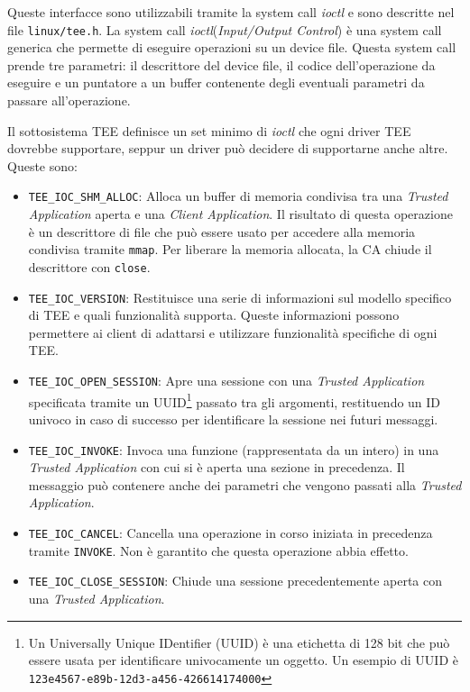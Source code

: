 \documentclass[12pt,italian]{report}
\begin{document}
Queste interfacce sono utilizzabili tramite la system call \textit{ioctl}
e sono descritte nel file \texttt{linux/tee.h}.
La system call \textit{ioctl}(\textit{Input/Output Control})
è una system call generica che permette di
eseguire operazioni su un device file.
Questa system call prende tre parametri:
il descrittore del device file, il codice dell'operazione da eseguire e
un puntatore a un buffer contenente degli eventuali parametri da passare
all'operazione.

Il sottosistema TEE definisce un set minimo di \textit{ioctl} che ogni
driver TEE dovrebbe supportare, seppur un driver può decidere di
supportarne anche altre.
Queste sono:
\begin{itemize}
    \item \texttt{TEE\_IOC\_SHM\_ALLOC}:
        Alloca un buffer di memoria condivisa tra una
        \textit{Trusted Application} aperta e una
        \textit{Client Application}.
        Il risultato di questa operazione è un descrittore
        di file che può essere usato per accedere alla memoria condivisa
        tramite \texttt{mmap}.
        Per liberare la memoria allocata, la CA chiude il descrittore con
        \texttt{close}. 

    \item \texttt{TEE\_IOC\_VERSION}:
        Restituisce una serie di informazioni sul modello specifico di TEE e
        quali funzionalità supporta.
        Queste informazioni possono permettere ai client di adattarsi e
        utilizzare funzionalità specifiche di ogni TEE.

    \item \texttt{TEE\_IOC\_OPEN\_SESSION}:
        Apre una sessione con una \textit{Trusted Application} specificata
        tramite un UUID\footnote{
            Un Universally Unique IDentifier (UUID) è una etichetta di 128 bit
            che può essere usata per identificare univocamente un oggetto.
            Un esempio di UUID è \texttt{123e4567-e89b-12d3-a456-426614174000}
        } passato tra gli argomenti, restituendo
        un ID univoco in caso di successo per identificare la sessione nei
        futuri messaggi.

    \item \texttt{TEE\_IOC\_INVOKE}:
        Invoca una funzione (rappresentata da un intero) in una
        \textit{Trusted Application} con cui si è aperta una sezione
        in precedenza.
        Il messaggio può contenere anche dei parametri che vengono passati
        alla \textit{Trusted Application}.

    \item \texttt{TEE\_IOC\_CANCEL}:
        Cancella una operazione in corso iniziata in precedenza tramite
        \texttt{INVOKE}.
        Non è garantito che questa operazione abbia effetto.

    \item \texttt{TEE\_IOC\_CLOSE\_SESSION}:
        Chiude una sessione precedentemente aperta con una
        \textit{Trusted Application}.
\end{itemize}
\end{document}
